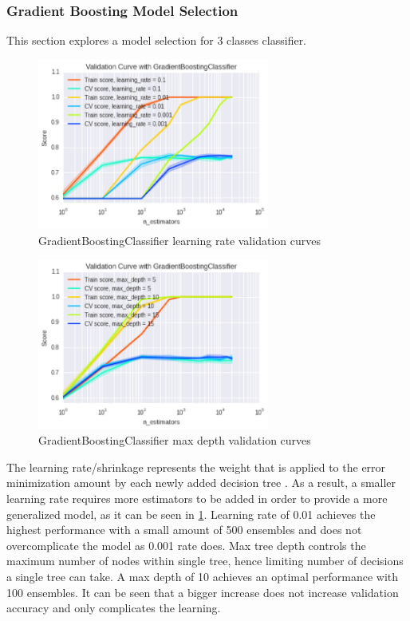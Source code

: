 \subsubsection{Gradient Boosting Model Selection}
This section explores a model selection for 3 classes classifier.

\begin{figure}[h]
\centering
\includegraphics[width=3.0in]{figures/v_curve1}
\caption{GradientBoostingClassifier learning rate validation curves} 
\label{fig:gradient1}
\end{figure}

\begin{figure}[h]
\centering
\includegraphics[width=3.0in]{figures/v_curve2}
\caption{GradientBoostingClassifier max depth validation curves}
\label{fig:gradient2}
\end{figure}

The learning rate/shrinkage represents the weight that is applied to the error minimization amount by each newly added decision tree \cite{biasvariance}. As a result, a smaller learning rate requires more estimators to be added in order to provide a more generalized model, as it can be seen in \figurename{} \ref{fig:gradient1}. Learning rate of 0.01 achieves the highest performance with a small amount of 500 ensembles and does not overcomplicate the model as 0.001 rate does. Max tree depth controls the maximum number of nodes within single tree, hence limiting number of decisions a single tree can take. A max depth of 10 achieves an optimal performance with 100 ensembles. It can be seen that a bigger increase does not increase validation accuracy and only complicates the learning. 

